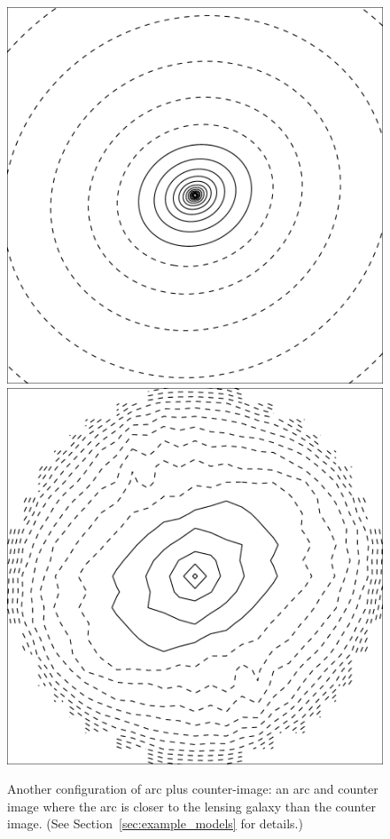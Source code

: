 \documentclass[usenatbib]{mn2e}
\newcommand{\secref}[1]{Section~\ref{sec:#1}}
\newlength{\myplotswidth}
\begin{document}
\begin{figure}
  \includegraphics[width=\myplotswidth]{fig/ASW0002z6f_006919_kappa}
  \includegraphics[width=\myplotswidth]{fig/006919_mass}

  \caption[result 6919 (ASW0002z6f)]{Another configuration of arc plus
    counter-image: an arc and counter image where the arc is closer to
    the lensing galaxy than the counter image. (See
    \secref{example_models} for details.)
    \vspace{1em}}
  \label{fig:6919}
\end{figure}
\end{document}
